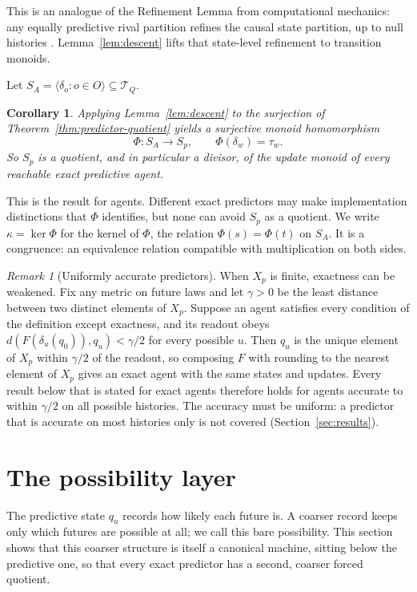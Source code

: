 \documentclass[10pt]{article}
\newtheorem{corollary}[theorem]{Corollary}
\theoremstyle{definition}
\theoremstyle{remark}
\newtheorem{remark}[theorem]{Remark}
\newcommand{\Obs}{O}
\begin{document}
This is an analogue of
the Refinement Lemma from computational mechanics: any equally predictive rival partition refines the
causal state partition, up to null histories \cite{ShaliziCrutchfield2001}.
Lemma~\ref{lem:descent} lifts that state-level refinement to transition
monoids.

Let $S_A=\langle\delta_o:o\in\Obs\rangle\subseteq\mathcal T_Q$.

\begin{corollary}
\label{cor:quotient}
Applying Lemma~\ref{lem:descent} to the surjection of
Theorem~\ref{thm:predictor-quotient} yields a surjective monoid
homomorphism
\[
  \Phi:S_A\rightarrow S_p,
  \qquad
  \Phi(\delta_w)=\tau_w.
\]
So $S_p$ is a quotient, and in particular a divisor, of the update
monoid of every reachable exact predictive agent.
\end{corollary}

This is the result for agents.  Different exact predictors may make
implementation distinctions that $\Phi$ identifies, but none can
avoid $S_p$ as a quotient.  We write $\kappa=\ker\Phi$ for the kernel
of $\Phi$, the relation $\Phi(s)=\Phi(t)$ on $S_A$.  It is a
congruence: an equivalence relation compatible with multiplication on
both sides.

\begin{remark}[Uniformly accurate predictors]
\label{rem:uniform}
When $X_p$ is finite, exactness can be weakened.  Fix any metric on
future laws and let $\gamma>0$ be the least distance between two
distinct elements of $X_p$.  Suppose an agent satisfies every
condition of the definition except exactness, and its readout obeys
$d(F(\delta_u(q_0)),q_u)<\gamma/2$ for every possible $u$.  Then
$q_u$ is the unique element of $X_p$ within $\gamma/2$ of the
readout, so composing $F$ with rounding to the nearest element of
$X_p$ gives an exact agent with the same states and updates.  Every
result below that is stated for exact agents therefore holds for
agents accurate to within $\gamma/2$ on all possible histories.  The
accuracy must be uniform: a predictor that is accurate on most
histories only is not covered (Section~\ref{sec:results}).
\end{remark}

\section{The possibility layer}
\label{sec:support}

The predictive state $q_u$ records how likely each future is.  A coarser
record keeps only which futures are possible at all; we call this
bare possibility.  This section shows
that this coarser structure is itself a canonical machine, sitting below
the predictive one, so that every exact predictor has a second, coarser
forced quotient.
\end{document}
